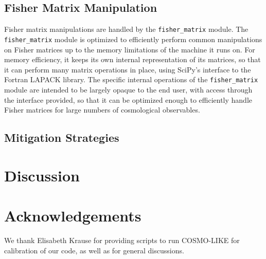 \documentclass[a4paper,11pt]{article}
\begin{document}
\subsection{Fisher Matrix Manipulation}
Fisher matrix manipulations are handled by the \texttt{fisher\_matrix} module. The \texttt{fisher\_matrix} module is optimized to efficiently perform common manipulations on Fisher matrices up to the memory limitations of the machine it runs on. For memory efficiency, it keeps its own internal representation of its matrices, so that it can perform many matrix operations in place, using SciPy's interface to the Fortran LAPACK library.  The specific internal operations of the \texttt{fisher\_matrix} module are intended to be largely opaque to the end user, with access through the interface provided, so that it can be optimized enough to efficiently handle Fisher matrices for large numbers of cosmological observables. 



\subsection{Mitigation Strategies}
\section{Discussion} 

\section{Acknowledgements} 
We thank Elisabeth Krause for providing scripts to run COSMO-LIKE for calibration of our code, as well as for general discussions. 





\appendix 
\end{document}
